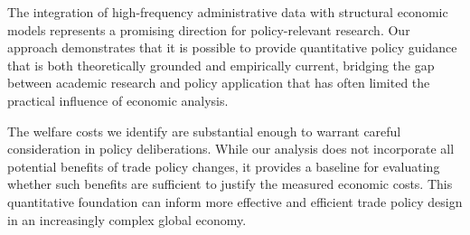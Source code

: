 The integration of high-frequency administrative data with structural economic models represents a promising direction for policy-relevant research. Our approach demonstrates that it is possible to provide quantitative policy guidance that is both theoretically grounded and empirically current, bridging the gap between academic research and policy application that has often limited the practical influence of economic analysis.

The welfare costs we identify are substantial enough to warrant careful consideration in policy deliberations. While our analysis does not incorporate all potential benefits of trade policy changes, it provides a baseline for evaluating whether such benefits are sufficient to justify the measured economic costs. This quantitative foundation can inform more effective and efficient trade policy design in an increasingly complex global economy.
